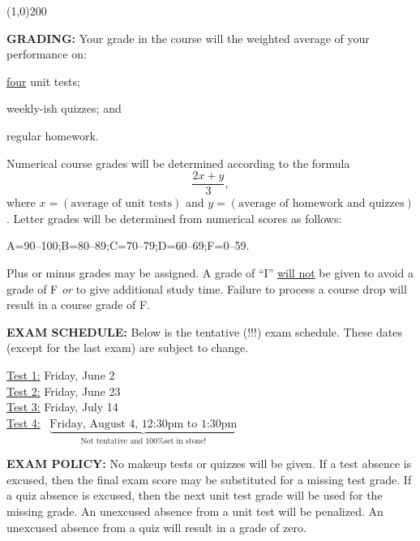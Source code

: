 \documentclass[12pt,oneside]{amsart}
\begin{document}
\vspace{-7mm}
\begin{center}
	\line(1,0){200}
\end{center}
\vspace{-1.75mm}

\noindent \textbf{GRADING:} Your grade in the course will the weighted average of your performance on: \begin{enumerate*}[label=(\alph*)]\item \ul{four} unit tests; \item weekly-ish quizzes; and \item regular homework.\end{enumerate*}\vspace{-3mm}

Numerical course grades will be determined according to the formula
$$\frac{2x+y}{3},$$
where $x=(\text{average of unit tests})$ and $y=(\text{average of homework and quizzes})$. Letter grades will be determined from numerical scores as follows: \vspace{-3mm}
\begin{center}
	A=90--100;\quad\quad\quad B=80--89;\quad\quad\quad C=70--79;\quad\quad\quad D=60--69;\quad\quad\quad F=0--59.
\end{center}\vspace{-3mm}
Plus or minus grades may be assigned. A grade of ``I'' \ul{will not} be given to avoid a grade of F \textit{or} to give additional study time. Failure to process a course drop will result in a course grade of F.

\noindent \textbf{EXAM SCHEDULE:} Below is the tentative (!!!) exam schedule. These dates (except for the last exam) are subject to change.\vspace{-3mm}

\indent \ul{Test 1:} Friday, June 2
\\[1.5mm]
\indent \ul{Test 2:} Friday, June 23
\\[1.5mm]
\indent \ul{Test 3:} Friday, July 14
\\[3mm]
\indent \ul{Test 4:}\,\,\, $\underbrace{\text{Friday, August 4, 12:30pm to 1:30pm}}_\text{Not tentative and 100\% set in stone!}$

\noindent \textbf{EXAM POLICY:} No makeup tests or quizzes will be given. If a test absence is excused, then the final exam score may be substituted for a missing test grade. If a quiz absence is excused, then the next unit test grade will be used for the missing grade. An unexcused absence from a unit test will be penalized. An unexcused absence from a quiz will result in a grade of zero. 
\end{document}
